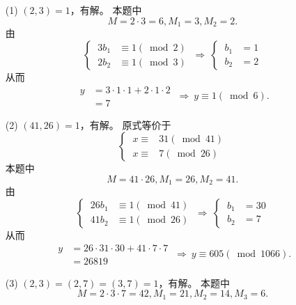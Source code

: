 \documentclass[UTF8]{ctexart}
\begin{document}
\subsection{}   %
\begin{enumerate}
    \item [(1)]$(2,3)=1$，有解。
    本题中
    \[
        M = 2\cdot 3 = 6  , M_1 = 3 , M_2 = 2.
    \]
    由
    \[
        \begin{cases}
            \ 3 b_1 &\equiv 1 (\bmod 2)\\
            \ 2 b_2 &\equiv 1 (\bmod 3)
        \end{cases}  
        \ \Rightarrow\ 
        \begin{cases}
            \ b_1 & = 1 \\
            \ b_2 & = 2 
        \end{cases}
    \]
    从而
    \[
        \begin{aligned}
            y 
            & = 3\cdot 1 \cdot 1 + 2\cdot 1 \cdot 2 \\
            & = 7
        \end{aligned}
        \ \Rightarrow\ 
        y\equiv 1 (\bmod 6).
    \]
    \item [(2)]$(41,26)=1$，有解。
    原式等价于
    \[
        \begin{cases}
            \ x \equiv & 31 (\bmod 41)\\
            \ x \equiv & 7 (\bmod 26)
        \end{cases}
    \]
    本题中
    \[
        M = 41\cdot 26 , M_1 = 26 , M_2 = 41.  
    \]
    由
    \[
        \begin{cases}
            \ 26 b_1 & \equiv 1 (\bmod 41)\\
            \ 41 b_2 & \equiv 1 (\bmod 26)
        \end{cases}  
        \ \Rightarrow\ 
        \begin{cases}
            \ b_1 & = 30\\
            \ b_2 & = 7
        \end{cases}
    \]
    从而
    \[
        \begin{aligned}
            y 
            & = 26\cdot 31 \cdot 30 + 41\cdot 7 \cdot 7 \\
            & = 26819
        \end{aligned}
        \ \Rightarrow\ 
        y\equiv 605 (\bmod 1066).
    \]
    \item [(3)]$(2,3)=(2,7)=(3,7)=1$，有解。
    本题中
    \[
        M = 2\cdot 3\cdot 7 =42 , M_1 = 21  , M_2 = 14, M_3 = 6.  
\]
\end{enumerate}
\end{document}
